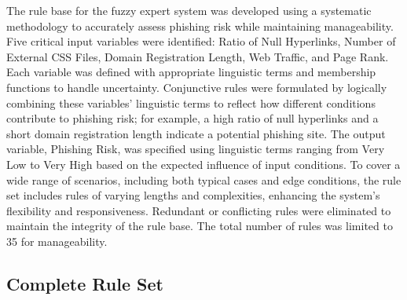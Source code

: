\documentclass{article}
\begin{document}
The rule base for the fuzzy expert system was developed using a systematic methodology to accurately assess phishing risk while maintaining manageability. Five critical input variables were identified: Ratio of Null Hyperlinks, Number of External CSS Files, Domain Registration Length, Web Traffic, and Page Rank. Each variable was defined with appropriate linguistic terms and membership functions to handle uncertainty. Conjunctive rules were formulated by logically combining these variables' linguistic terms to reflect how different conditions contribute to phishing risk; for example, a high ratio of null hyperlinks and a short domain registration length indicate a potential phishing site. The output variable, Phishing Risk, was specified using linguistic terms ranging from Very Low to Very High based on the expected influence of input conditions. To cover a wide range of scenarios, including both typical cases and edge conditions, the rule set includes rules of varying lengths and complexities, enhancing the system's flexibility and responsiveness. Redundant or conflicting rules were eliminated to maintain the integrity of the rule base. The total number of rules was limited to 35 for manageability.

\subsection{Complete Rule Set}
\end{document}
